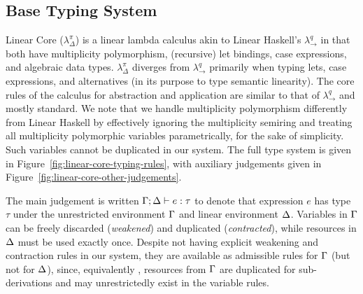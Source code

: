 \documentclass[acmsmall,review,screen]{acmart}
\newcommand{\ROUNDTWO}[1]{{\color{red}#1}}
\begin{document}
% 

\subsection{Base Typing System\label{sec:base-calculi}}

Linear Core ($\lambda^\pi_\Delta$) is a linear lambda calculus akin to Linear
Haskell's $\lambda^q_\to$ in that both have multiplicity polymorphism,
(recursive) let bindings, case expressions, and algebraic data types.
$\lambda^\pi_\Delta$ diverges from $\lambda^q_\to$ primarily when typing lets,
case expressions, and alternatives (in its purpose to type semantic linearity).
%
%
%
The core rules of the calculus for abstraction and application are similar to
that of $\lambda^q_\to$ and mostly standard. 
We note that we handle multiplicity polymorphism differently from
Linear Haskell by \ROUNDTWO{effectively} ignoring the multiplicity semiring and
treating all multiplicity polymorphic \ROUNDTWO{variables}
\ROUNDTWO{parametrically}, for the sake of simplicity. \ROUNDTWO{Such
  variables cannot be duplicated in our system.}
%
The full type system is given in Figure~\ref{fig:linear-core-typing-rules},
with auxiliary judgements given in
Figure~\ref{fig:linear-core-other-judgements}.

\TypingRules
\TypingRulesOther

The main judgement is written $\Gamma;\Delta \vdash e : \tau$ to denote that expression
$e$ has type $\tau$ under the unrestricted environment $\Gamma$ and linear
environment $\Delta$.
%
%
Variables in $\Gamma$ can be freely discarded (\emph{weakened}) and duplicated
(\emph{contracted}), while resources in $\Delta$ must be used exactly once. Despite
not having explicit weakening and contraction rules in our system, they are
available as admissible rules for $\Gamma$ (but not for $\Delta$), since, equivalently
\cite{91621fae-5e53-3497-8291-32b2fab5a743}, resources from $\Gamma$ are duplicated
for sub-derivations and may unrestrictedly exist in the variable rules.
%
\end{document}
